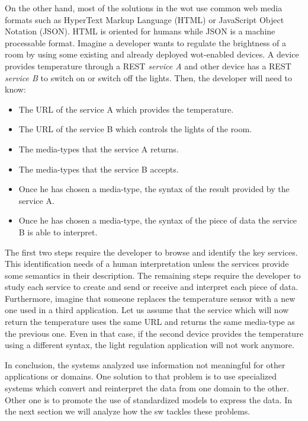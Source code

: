 \medskip

On the other hand, most of the solutions in the \ac{wot} use common web media formats such as HyperText Markup Language (HTML) or JavaScript Object Notation (JSON). %
HTML is oriented for humans while JSON is a machine processable format.
Imagine a developer wants to regulate the brightness of a room by using some existing and already deployed \acs{wot}-enabled devices.
A device provides temperature through a REST \emph{service A} and other device has a REST \emph{service B} to switch on or switch off the lights.
Then, the developer will need to know:
\begin{itemize}
 \item The URL of the service A which provides the temperature.
 \item The URL of the service B which controls the lights of the room.
 \item The media-types that the service A returns.
 \item The media-types that the service B accepts.
 \item Once he has chosen a media-type, the syntax of the result provided by the service A.
 \item Once he has chosen a media-type, the syntax of the piece of data the service B is able to interpret.
\end{itemize}

The first two steps require the developer to browse and identify the key services.
This identification needs of a human interpretation unless the services provide some semantics in their description. %
The remaining steps require the developer to study each service to create and send or receive and interpret each piece of data.
Furthermore, imagine that someone replaces the temperature sensor with a new one used in a third application.
Let us assume that the service which will now return the temperature uses the same URL and returns the same media-type as the previous one.
Even in that case, if the second device provides the temperature using a different syntax, the light regulation application will not work anymore.

\medskip


In conclusion, the systems analyzed use information not meaningful for other applications or domains.
One solution to that problem is to use specialized systems which convert and reinterpret the data from one domain to the other.
Other one is to promote the use of standardized models to express the data.
In the next section we will analyze how the \acl{sw} tackles these problems.


